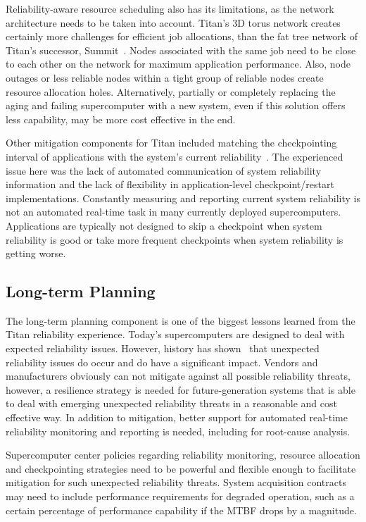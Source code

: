 Reliability-aware resource scheduling also has its limitations, as the network
architecture needs to be taken into account. Titan's 3D torus network creates
certainly more challenges for efficient job allocations, than the fat tree
network of Titan's successor, Summit~\cite{olcf:summit}. Nodes associated with
the same job need to be close to each other on the network for maximum
application performance. Also, node outages or less reliable nodes within a
tight group of reliable nodes create resource allocation holes.
%
Alternatively, partially or completely replacing the aging and failing
supercomputer with a new system, even if this solution offers less capability,
may be more cost effective in the end.

Other mitigation components for Titan included matching the checkpointing
interval of applications with the system's current
reliability~\cite{bautista-gomez16reducing, 6903564}. The experienced issue here
was the lack of automated communication of system reliability information and
the lack of flexibility in application-level checkpoint/restart implementations.
Constantly measuring and reporting current system reliability is not an automated
real-time task in many currently deployed supercomputers. Applications are
typically not designed to skip a checkpoint when system reliability is good or
take more frequent checkpoints when system reliability is getting worse.

\subsection{Long-term Planning}
\label{section:planning}

The long-term planning component is one of the biggest lessons learned from the
Titan reliability experience. Today's supercomputers are designed to deal with
expected reliability issues. However, history has shown~\cite{geist12kill} that
unexpected reliability issues do occur and do have a significant impact. Vendors
and manufacturers obviously can not mitigate against all possible reliability
threats, however, a resilience strategy is needed for future-generation systems
that is able to deal with emerging unexpected reliability threats in a
reasonable and cost effective way. In addition to mitigation, better support for
automated real-time reliability monitoring and reporting is needed, including
for root-cause analysis.

Supercomputer center policies regarding reliability monitoring, resource
allocation and checkpointing strategies need to be powerful and flexible enough
to facilitate mitigation for such unexpected reliability threats. System
acquisition contracts may need to include performance requirements for degraded
operation, such as a certain percentage of performance capability if the MTBF
drops by a magnitude.
